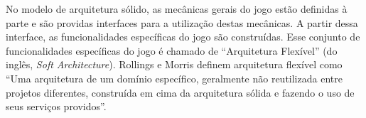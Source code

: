 No modelo de arquitetura sólido, as mecânicas gerais do jogo estão definidas à parte e são providas interfaces para a utilização destas mecânicas. A partir dessa interface, as funcionalidades específicas do jogo são construídas. Esse conjunto de funcionalidades específicas do jogo é chamado de “Arquitetura Flexível” (do inglês, \textit{Soft Architecture}). Rollings e Morris \cite{rollings2004game} definem arquitetura flexível como “Uma arquitetura de um domínio específico, geralmente não reutilizada entre projetos diferentes, construída em cima da arquitetura sólida e fazendo o uso de seus serviços providos”.
